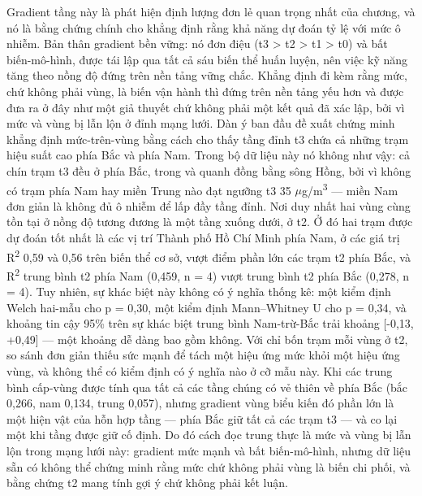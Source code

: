 Gradient tầng này là phát hiện định lượng đơn lẻ quan trọng nhất của chương, và nó là bằng chứng chính cho khẳng định rằng khả năng dự đoán tỷ lệ với mức ô nhiễm. Bản thân gradient bền vững: nó đơn điệu (t3 > t2 > t1 > t0) và bất biến-mô-hình, được tái lập qua tất cả sáu biến thể huấn luyện, nên việc kỹ năng tăng theo nồng độ đứng trên nền tảng vững chắc. Khẳng định đi kèm rằng mức, chứ không phải vùng, là biến vận hành thì đứng trên nền tảng yếu hơn và được đưa ra ở đây như một giả thuyết chứ không phải một kết quả đã xác lập, bởi vì mức và vùng bị lẫn lộn ở đỉnh mạng lưới. Dàn ý ban đầu đề xuất chứng minh khẳng định mức-trên-vùng bằng cách cho thấy tầng đỉnh t3 chứa cả những trạm hiệu suất cao phía Bắc và phía Nam. Trong bộ dữ liệu này nó không như vậy: cả chín trạm t3 đều ở phía Bắc, trong và quanh đồng bằng sông Hồng, bởi vì không có trạm phía Nam hay miền Trung nào đạt ngưỡng t3 35 $\mu$g/m\textsuperscript{3} --- miền Nam đơn giản là không đủ ô nhiễm để lấp đầy tầng đỉnh. Nơi duy nhất hai vùng cùng tồn tại ở nồng độ tương đương là một tầng xuống dưới, ở t2. Ở đó hai trạm được dự đoán tốt nhất là các vị trí Thành phố Hồ Chí Minh phía Nam, ở các giá trị R\textsuperscript{2} 0,59 và 0,56 trên biến thể cơ sở, vượt điểm phần lớn các trạm t2 phía Bắc, và R\textsuperscript{2} trung bình t2 phía Nam (0,459, n = 4) vượt trung bình t2 phía Bắc (0,278, n = 4). Tuy nhiên, sự khác biệt này không có ý nghĩa thống kê: một kiểm định Welch hai-mẫu cho p = 0,30, một kiểm định Mann--Whitney U cho p = 0,34, và khoảng tin cậy 95\% trên sự khác biệt trung bình Nam-trừ-Bắc trải khoảng [-0,13, +0,49] --- một khoảng dễ dàng bao gồm không. Với chỉ bốn trạm mỗi vùng ở t2, so sánh đơn giản thiếu sức mạnh để tách một hiệu ứng mức khỏi một hiệu ứng vùng, và không thể có kiểm định có ý nghĩa nào ở cỡ mẫu này. Khi các trung bình cấp-vùng được tính qua tất cả các tầng chúng có vẻ thiên về phía Bắc (bắc 0,266, nam 0,134, trung 0,057), nhưng gradient vùng biểu kiến đó phần lớn là một hiện vật của hỗn hợp tầng --- phía Bắc giữ tất cả các trạm t3 --- và co lại một khi tầng được giữ cố định. Do đó cách đọc trung thực là mức và vùng bị lẫn lộn trong mạng lưới này: gradient mức mạnh và bất biến-mô-hình, nhưng dữ liệu sẵn có không thể chứng minh rằng mức chứ không phải vùng là biến chi phối, và bằng chứng t2 mang tính gợi ý chứ không phải kết luận.

